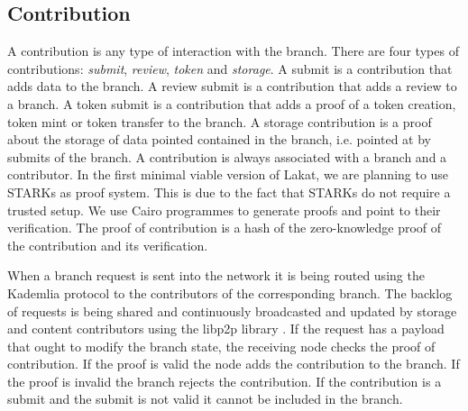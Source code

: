 \subsection{Contribution}
\label{ssc:contribution}

A contribution is any type of interaction with the branch. There are four types of contributions: \textit{submit}, \textit{review}, \textit{token} and \textit{storage}. A submit is a contribution that adds data to the branch. A review submit is a contribution that adds a review to a branch. A token submit is a contribution that adds a proof of a token creation, token mint or token transfer to the branch. A storage contribution is a proof about the storage of data pointed contained in the branch, i.e. pointed at by submits of the branch. A contribution is always associated with a branch and a contributor. In the first minimal viable version of Lakat, we are planning to use STARKs \cite{} as proof system. This is due to the fact that STARKs do not require a trusted setup. We use Cairo programmes to generate proofs and point to their verification. The proof of contribution is a hash of the zero-knowledge proof of the contribution and its verification.

When a branch request is sent into the network it is being routed using the Kademlia protocol to the contributors of the corresponding branch. The backlog of requests is being shared and continuously broadcasted and updated by storage and content contributors using the libp2p library \cite{}. If the request has a payload that ought to modify the branch state, the receiving node checks the proof of contribution. If the proof is valid the node adds the contribution to the branch. If the proof is invalid the branch rejects the contribution. If the contribution is a submit and the submit is not valid it cannot be included in the branch. 